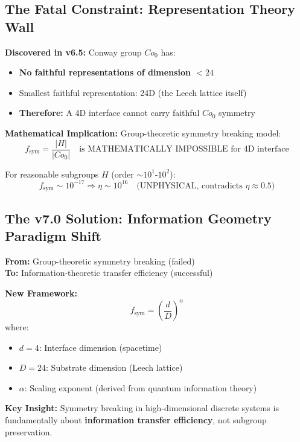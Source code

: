 \documentclass[11pt,titlepage]{article}
\begin{document}
\subsection{The Fatal Constraint: Representation Theory Wall}

\textbf{Discovered in v6.5:} Conway group $Co_0$ has:
\begin{itemize}
\item \textbf{No faithful representations of dimension $<24$}
\item Smallest faithful representation: 24D (the Leech lattice itself)
\item \textbf{Therefore:} A 4D interface cannot carry faithful $Co_0$ symmetry
\end{itemize}

\textbf{Mathematical Implication:} Group-theoretic symmetry breaking model:
\[
f_{\mathrm{sym}} = \frac{|H|}{|Co_0|} \quad \text{is MATHEMATICALLY IMPOSSIBLE for 4D interface}
\]

For reasonable subgroups $H$ (order $\sim 10^1$-$10^2$):
\[
f_{\mathrm{sym}} \sim 10^{-17} \Rightarrow \eta \sim 10^{16} \quad \text{(UNPHYSICAL, contradicts $\eta \approx 0.5$)}
\]

\subsection{The v7.0 Solution: Information Geometry Paradigm Shift}

\begin{tcolorbox}[colback=blue!5!white,colframe=blue!75!black,title=Paradigm Shift (v7.0)]
\textbf{From:} Group-theoretic symmetry breaking (failed)\\
\textbf{To:} Information-theoretic transfer efficiency (successful)
\end{tcolorbox}

\textbf{New Framework:}
\[
f_{\mathrm{sym}} = \left(\frac{d}{D}\right)^\alpha
\]
where:
\begin{itemize}
\item $d = 4$: Interface dimension (spacetime)
\item $D = 24$: Substrate dimension (Leech lattice)  
\item $\alpha$: Scaling exponent (derived from quantum information theory)
\end{itemize}

\textbf{Key Insight:} Symmetry breaking in high-dimensional discrete systems is fundamentally about \textbf{information transfer efficiency}, not subgroup preservation.
\end{document}
